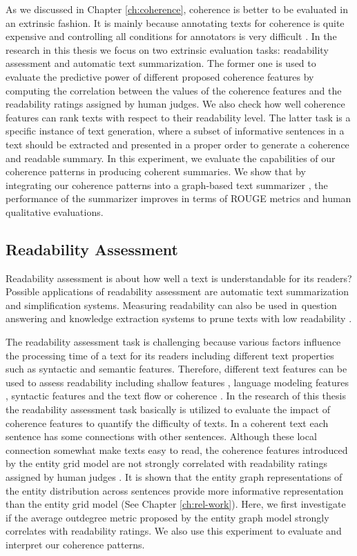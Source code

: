 As we discussed in Chapter \ref{ch:coherence}, coherence is better to be evaluated in an extrinsic fashion. 
It is mainly because annotating texts for coherence is quite expensive and controlling all conditions for annotators is very difficult \cite{karamanis04a}. 
In the research in this thesis we focus on two extrinsic evaluation tasks: readability assessment and automatic text summarization. 
The former one is used to evaluate the predictive power of different proposed coherence features by computing the correlation between the values of the coherence features and the readability ratings assigned by human judges. 
We also check how well coherence features can rank texts with respect to their readability level. 
The latter task is a specific instance of text generation, where a subset of informative sentences in a text should be extracted and presented in a proper order to generate a coherence and readable summary. 
In this experiment, we evaluate the capabilities of our coherence patterns in producing coherent summaries. 
We show that by integrating our coherence patterns into a graph-based text summarizer \cite{parveen15a}, the performance of the summarizer improves in terms of ROUGE metrics and human qualitative evaluations.

\subsection{Readability Assessment}
\label{sec:readability_assessment}

Readability assessment is about how well a text is understandable for its readers? 
Possible applications of readability assessment are automatic text summarization and simplification systems. 
Measuring readability can also be used in question answering and knowledge extraction systems to prune texts with low readability \cite{kate10}. 

The readability assessment task is challenging because various factors influence the processing time of a text for its readers including different text properties such as syntactic and semantic features.
Therefore, different text features can be used to assess readability including shallow features \cite{flesch48,kincaid75}, language modeling features \cite{siluo01,collins-thompson04}, syntactic features \cite{schwarm05} and the text flow or coherence \cite{barzilay08,pitler08}.
In the research of this thesis the readability assessment task basically is utilized to evaluate the impact of coherence features to quantify the difficulty of texts.  
In a coherent text each sentence has some connections with other sentences. 
Although these local connection somewhat make texts easy to read, the coherence features introduced by the entity grid model \cite{barzilay08} are not strongly correlated with readability ratings assigned by human judges \cite{pitler08}.  
It is shown that the entity graph representations of the entity distribution across sentences provide more informative representation than the entity grid model (See Chapter \ref{ch:rel-work}).  
Here, we first investigate if the average outdegree metric proposed by the entity graph model strongly correlates with readability ratings. 
We also use this experiment to evaluate and interpret our coherence patterns. 

